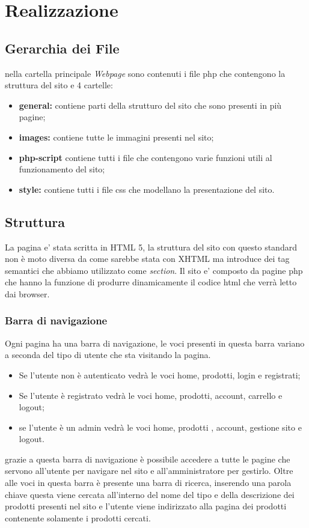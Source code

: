 \section{Realizzazione}
\subsection{Gerarchia dei File}
nella cartella principale \textit{Webpage} sono contenuti i file php che contengono la struttura del sito e 4 cartelle:
\begin{itemize}
	\item \textbf{general:} contiene parti della strutturo del sito che sono presenti in più pagine;
	\item \textbf{images:} contiene tutte le immagini presenti nel sito;
	\item \textbf{php-script} contiene tutti i file che contengono varie funzioni utili al funzionamento del sito;
	\item \textbf{style:} contiene tutti i file css che modellano la presentazione del sito.
\end{itemize}
\subsection{Struttura}
La pagina e' stata scritta in HTML 5, la struttura del sito con questo standard non è moto diversa da come sarebbe stata con XHTML ma introduce dei tag semantici che abbiamo utilizzato come \emph{section}.\newline
Il sito e' composto da pagine php che hanno la funzione di produrre dinamicamente il codice html che verrà letto dai browser.\newline


\subsubsection{Barra di navigazione} 
Ogni pagina ha una barra di navigazione, le voci presenti in questa barra variano a seconda del tipo di utente che sta visitando la pagina.
\begin{itemize}
\item Se l'utente non è autenticato vedrà le voci home, prodotti, login e registrati;
\item Se l'utente è registrato vedrà le voci home, prodotti, account, carrello e logout;
\item se l'utente è un admin vedrà le voci home, prodotti , account, gestione sito e logout.
\end{itemize}
grazie a questa barra di navigazione è possibile accedere a tutte le pagine che servono all'utente per navigare nel sito e all'amministratore per gestirlo. Oltre alle voci in questa barra è presente una barra di ricerca, inserendo una parola chiave questa viene cercata all'interno del nome del tipo e della descrizione dei prodotti presenti nel sito e l'utente viene indirizzato alla pagina dei prodotti contenente solamente i prodotti cercati.

